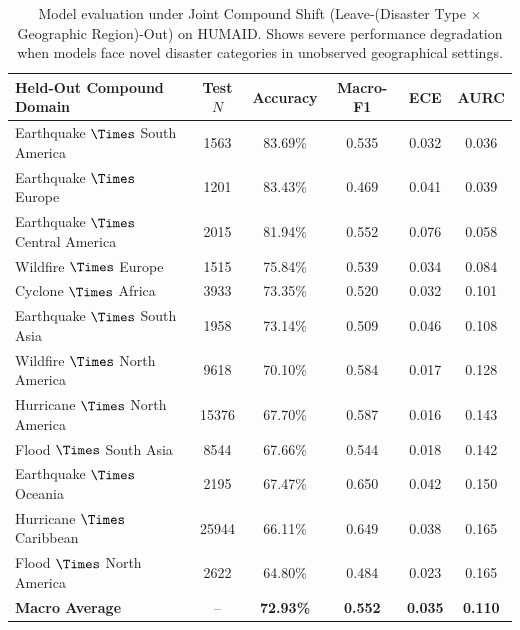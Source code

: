 \begin{table}[t]
\centering
\caption{Model evaluation under Joint Compound Shift (Leave-(Disaster Type $\times$ Geographic Region)-Out) on HUMAID. Shows severe performance degradation when models face novel disaster categories in unobserved geographical settings.}
\label{tab:compound_shift_humaid}
\begin{tabular}{lccccc}
\toprule
\textbf{Held-Out Compound Domain} & \textbf{Test $N$} & \textbf{Accuracy} & \textbf{Macro-F1} & \textbf{ECE} & \textbf{AURC} \\
\midrule
Earthquake $\Times$ South America & 1563 & 83.69\% & 0.535 & 0.032 & 0.036 \\
Earthquake $\Times$ Europe & 1201 & 83.43\% & 0.469 & 0.041 & 0.039 \\
Earthquake $\Times$ Central America & 2015 & 81.94\% & 0.552 & 0.076 & 0.058 \\
Wildfire $\Times$ Europe & 1515 & 75.84\% & 0.539 & 0.034 & 0.084 \\
Cyclone $\Times$ Africa & 3933 & 73.35\% & 0.520 & 0.032 & 0.101 \\
Earthquake $\Times$ South Asia & 1958 & 73.14\% & 0.509 & 0.046 & 0.108 \\
Wildfire $\Times$ North America & 9618 & 70.10\% & 0.584 & 0.017 & 0.128 \\
Hurricane $\Times$ North America & 15376 & 67.70\% & 0.587 & 0.016 & 0.143 \\
Flood $\Times$ South Asia & 8544 & 67.66\% & 0.544 & 0.018 & 0.142 \\
Earthquake $\Times$ Oceania & 2195 & 67.47\% & 0.650 & 0.042 & 0.150 \\
Hurricane $\Times$ Caribbean & 25944 & 66.11\% & 0.649 & 0.038 & 0.165 \\
Flood $\Times$ North America & 2622 & 64.80\% & 0.484 & 0.023 & 0.165 \\
\midrule
\textbf{Macro Average} & -- & \textbf{72.93\%} & \textbf{0.552} & \textbf{0.035} & \textbf{0.110} \\
\bottomrule
\end{tabular}
\end{table}
